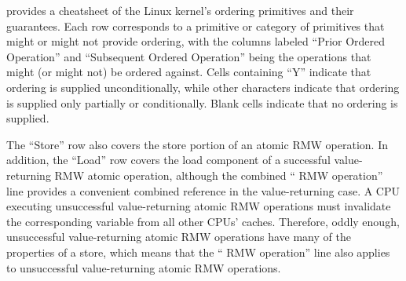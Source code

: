 \begin{table}[tbh]
\vspace{5pt}\hfill
{}\OneColumnHSpace{-0.9in}
\caption{Linux-Kernel Memory-Ordering Cheat Sheet}
\label{tab:memorder:Linux-Kernel Memory-Ordering Cheat Sheet}
\end{table}

provides a cheatsheet of the Linux kernel's ordering primitives and their
guarantees.
Each row corresponds to a primitive or category of primitives that might
or might not provide ordering, with the columns labeled
``Prior Ordered Operation'' and ``Subsequent Ordered Operation''
being the operations that might (or might not) be ordered against.
Cells containing ``Y'' indicate that ordering is supplied unconditionally,
while other characters indicate that ordering is supplied only partially or
conditionally.
Blank cells indicate that no ordering is supplied.

The ``Store'' row also covers the store portion of an atomic RMW operation.
In addition, the ``Load'' row covers the load
component of a successful value-returning  RMW atomic
operation, although the combined `` RMW operation''
line provides a convenient combined reference in the value-returning case.
A CPU executing unsuccessful value-returning atomic RMW operations must
invalidate the corresponding variable from all other CPUs' caches.
Therefore, oddly enough, unsuccessful value-returning atomic RMW
operations have many of the properties of a store, which means that the
`` RMW operation'' line also applies to unsuccessful
value-returning atomic RMW operations.


